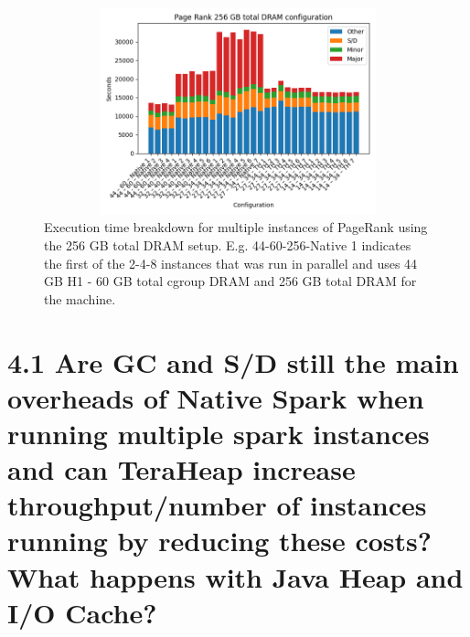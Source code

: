 \documentclass[twocolumn,10pt]{asme2e}
\begin{document}
\begin{figure}[h!]
        \includegraphics[width=13cm,height=6cm]{pr256.png}
	\caption{Execution time breakdown for multiple instances of PageRank using the 256 GB total DRAM setup. 
	E.g. 44-60-256-Native 1 indicates the first of the 2-4-8 instances that was run in parallel and uses 44 GB H1 - 60 GB total cgroup DRAM and 256 GB total DRAM for the machine.}
	\label{fig:pr256}
\end{figure}

\section*{4.1 Are GC and S/D still the main overheads of Native Spark when running multiple spark instances and can TeraHeap increase throughput/number of instances running by reducing these costs? What happens with Java Heap and I/O Cache?}
\end{document}

